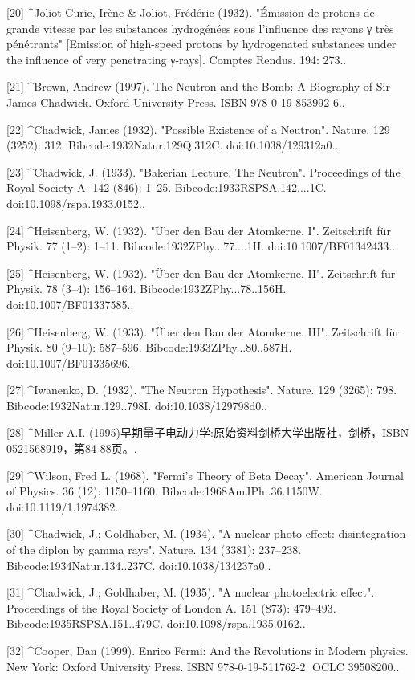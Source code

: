 [20]
^Joliot-Curie, Irène & Joliot, Frédéric (1932). "Émission de protons de grande vitesse par les substances hydrogénées sous l'influence des rayons γ très pénétrants" [Emission of high-speed protons by hydrogenated substances under the influence of very penetrating γ-rays]. Comptes Rendus. 194: 273..

[21]
^Brown, Andrew (1997). The Neutron and the Bomb: A Biography of Sir James Chadwick. Oxford University Press. ISBN 978-0-19-853992-6..

[22]
^Chadwick, James (1932). "Possible Existence of a Neutron". Nature. 129 (3252): 312. Bibcode:1932Natur.129Q.312C. doi:10.1038/129312a0..

[23]
^Chadwick, J. (1933). "Bakerian Lecture. The Neutron". Proceedings of the Royal Society A. 142 (846): 1–25. Bibcode:1933RSPSA.142....1C. doi:10.1098/rspa.1933.0152..

[24]
^Heisenberg, W. (1932). "Über den Bau der Atomkerne. I". Zeitschrift für Physik. 77 (1–2): 1–11. Bibcode:1932ZPhy...77....1H. doi:10.1007/BF01342433..

[25]
^Heisenberg, W. (1932). "Über den Bau der Atomkerne. II". Zeitschrift für Physik. 78 (3–4): 156–164. Bibcode:1932ZPhy...78..156H. doi:10.1007/BF01337585..

[26]
^Heisenberg, W. (1933). "Über den Bau der Atomkerne. III". Zeitschrift für Physik. 80 (9–10): 587–596. Bibcode:1933ZPhy...80..587H. doi:10.1007/BF01335696..

[27]
^Iwanenko, D. (1932). "The Neutron Hypothesis". Nature. 129 (3265): 798. Bibcode:1932Natur.129..798I. doi:10.1038/129798d0..

[28]
^Miller A.I. (1995)早期量子电动力学:原始资料剑桥大学出版社，剑桥，ISBN 0521568919，第84-88页。.

[29]
^Wilson, Fred L. (1968). "Fermi's Theory of Beta Decay". American Journal of Physics. 36 (12): 1150–1160. Bibcode:1968AmJPh..36.1150W. doi:10.1119/1.1974382..

[30]
^Chadwick, J.; Goldhaber, M. (1934). "A nuclear photo-effect: disintegration of the diplon by gamma rays". Nature. 134 (3381): 237–238. Bibcode:1934Natur.134..237C. doi:10.1038/134237a0..

[31]
^Chadwick, J.; Goldhaber, M. (1935). "A nuclear photoelectric effect". Proceedings of the Royal Society of London A. 151 (873): 479–493. Bibcode:1935RSPSA.151..479C. doi:10.1098/rspa.1935.0162..

[32]
^Cooper, Dan (1999). Enrico Fermi: And the Revolutions in Modern physics. New York: Oxford University Press. ISBN 978-0-19-511762-2. OCLC 39508200..


